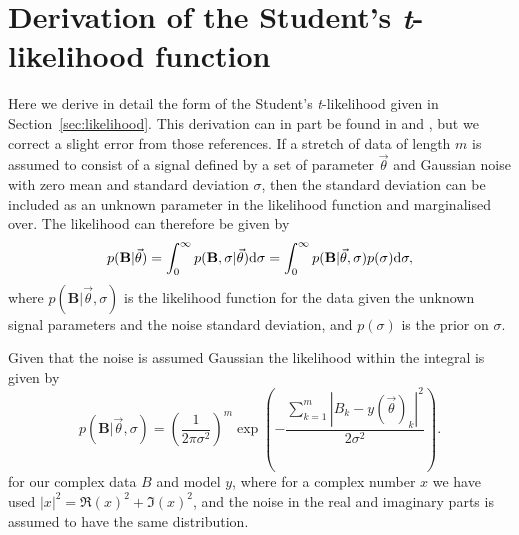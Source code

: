 \appendix

\section{Derivation of the Student's {\it t}-likelihood function}\label{app:likelihood}

Here we derive in detail the form of the Student's {\it t}-likelihood given in Section~\ref{sec:likelihood}.
This derivation can in part be found in \citet{Dupuisthesis} and \citet{2005PhRvD..72j2002D}, but we correct a
slight error from those references. If a stretch of data of length $m$ is assumed to consist of a signal
defined by a set of parameter $\vec{\theta}$ and Gaussian noise with zero mean and standard deviation
$\sigma$, then the standard deviation can be included as an unknown parameter in the likelihood function and
marginalised over. The likelihood can therefore be given by
\begin{equation}\label{eq:likesigma}
p(\mathbf{B}|\vec{\theta}) = \int_0^{\infty} p(\mathbf{B},\sigma|\vec{\theta}) {\rm d}\sigma =
\int_0^{\infty} p(\mathbf{B}|\vec{\theta},\sigma)p(\sigma) {\rm d}\sigma,
\end{equation}
where $p(\mathbf{B}|\vec{\theta},\sigma)$ is the likelihood function for the data given the unknown signal
parameters and the noise standard deviation, and $p(\sigma)$ is the prior on $\sigma$.

Given that the noise is assumed Gaussian the likelihood within the integral is given by
\begin{equation}\label{eq:likesigma2}
p(\mathbf{B}|\vec{\theta},\sigma) = \left(\frac{1}{2\pi\sigma^2}\right)^{m}
\exp{\left( -\frac{\sum_{k=1}^m|B_k-y(\vec{\theta})_k|^2}{2\sigma^2} \right)}.
\end{equation}
for our complex data $B$ and model $y$, where for a complex number $x$ we have used $|x|^2 =
\Re{(x)}^2+\Im{(x)}^2$, and the noise in the real and imaginary parts is assumed to have the same
distribution.

